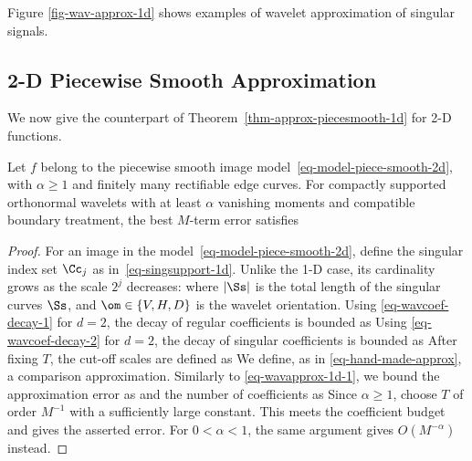 Figure \ref{fig-wav-approx-1d} shows examples of wavelet approximation of singular signals. 


                                        
\subsection{2-D Piecewise Smooth Approximation}

We now give the counterpart of Theorem~\ref{thm-approx-piecesmooth-1d} for 2-D functions.

\begin{thm}\label{thm-approx-piecesmooth-2d}
Let $f$ belong to the piecewise smooth image model~\eqref{eq-model-piece-smooth-2d}, with $\alpha\geq1$ and finitely many rectifiable edge curves. For compactly supported orthonormal wavelets with at least $\alpha$ vanishing moments and compatible boundary treatment, the best $M$-term error satisfies
\end{thm}

\begin{proof}
For an image in the model~\eqref{eq-model-piece-smooth-2d}, define the singular index set $\Cc_j$ as in~\eqref{eq-singsupport-1d}. Unlike the 1-D case, its cardinality grows as the scale $2^j$ decreases:
where $|\Ss|$ is the total length of the singular curves $\Ss$, and $\om \in \{V,H,D\}$ is the wavelet orientation.
Using \eqref{eq-wavcoef-decay-1} for $d=2$, the decay of regular coefficients is bounded as
Using \eqref{eq-wavcoef-decay-2} for $d=2$, the decay of singular coefficients is bounded as
After fixing $T$, the cut-off scales are defined as 
We define, as in \eqref{eq-hand-made-approx}, a comparison approximation.
Similarly to \eqref{eq-wavapprox-1d-1}, we bound the approximation error as
and the number of coefficients as 
Since $\alpha\geq1$, choose $T$ of order $M^{-1}$ with a sufficiently large constant. This meets the coefficient budget and gives the asserted error. For $0<\alpha<1$, the same argument gives $O(M^{-\alpha})$ instead.
\end{proof}


